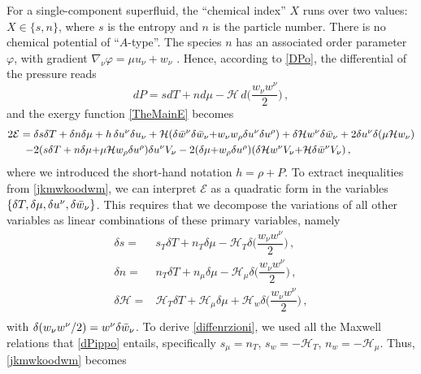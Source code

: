 \documentclass[a4paper, amsfonts, amssymb, amsmath, reprint, showkeys, nofootinbib, twoside,notitlepage,onecolumn]{revtex4-2}
\theoremstyle{definition}
\theoremstyle{theorem}
\theoremstyle{corollary}
\begin{document}
For a single-component superfluid, the ``chemical index'' $X$ runs over two values: $X\in \{s,n\}$, where $s$ is the entropy and $n$ is the particle number. There is no chemical potential of ``$A$-type''. The species $n$ has an associated order parameter $\varphi$, with gradient $\nabla_\nu \varphi=\mu u_\nu +w_\nu $ . Hence, according to \eqref{DPo}, the differential of the pressure reads
\begin{equation}\label{dPippo}
dP= sdT + n d\mu   - \mathcal{H} \,  d\bigg(\dfrac{w_\nu w^{\nu}}{2} \bigg) \, ,
\end{equation}
and the exergy function \eqref{TheMainE} becomes
\begin{equation}\label{jkmwkoodwm}
\begin{split}
2\mathcal{E}={}& \delta s \delta T + \delta n \delta \mu +h \, \delta u^\nu \delta u_\nu +\mathcal{H}( \delta \Bar{w}^{\nu}\delta\Bar{w}_\nu {+} w_\nu  w_\rho \delta u^\nu \delta u^\rho) +\delta \mathcal{H} w^{\nu}\delta \Bar{w}_\nu +2 \delta u^\nu \delta (\mu \mathcal{H} w_\nu) \\
-{}& 2(s\delta T +n \delta \mu {+}\mu \mathcal{H}w_\rho \delta u^\rho)\delta u^\nu V_\nu -2(\delta \mu {+}w_\rho \delta u^\rho)(\delta \mathcal{H} w^{\nu} V_\nu{+}\mathcal{H}\delta \Bar{w}^{\nu} V_\nu) \, , \\
\end{split}    
\end{equation}
where we introduced the short-hand notation $h =\rho{+}P$.
To extract inequalities from \eqref{jkmwkoodwm}, we can interpret $\mathcal{E}$ as a quadratic form in the variables $\{\delta T, \delta \mu, \delta u^\nu, \delta \Bar{w}_\nu \}$. This requires that we decompose the variations of all other variables as linear combinations of these primary variables, namely
\begin{equation}\label{diffenrzioni}
\begin{split}
\delta s ={}& s_T \delta T + n_T \delta \mu -\mathcal{H}_T \delta\bigg(\dfrac{w_\nu w^{\nu}}{2} \bigg) \, ,\\
\delta n ={}& n_T \delta T + n_\mu \delta \mu -\mathcal{H}_\mu \delta \bigg(\dfrac{w_\nu w^{\nu}}{2} \bigg) \, ,\\
\delta \mathcal{H} ={}& \mathcal{H}_T \delta T + \mathcal{H}_\mu \delta \mu +\mathcal{H}_w \delta \bigg(\dfrac{w_\nu w^{\nu}}{2} \bigg)\, ,\\
\end{split}    
\end{equation}
with $\delta(w_\nu w^\nu/2)=w^\nu \delta \Bar{w}_\nu$. To derive \eqref{diffenrzioni}, we used all the Maxwell relations that \eqref{dPippo} entails, specifically $s_\mu =n_T$, $s_w =-\mathcal{H}_T$, $n_w=-\mathcal{H}_\mu$. Thus, \eqref{jkmwkoodwm} becomes
\end{document}
